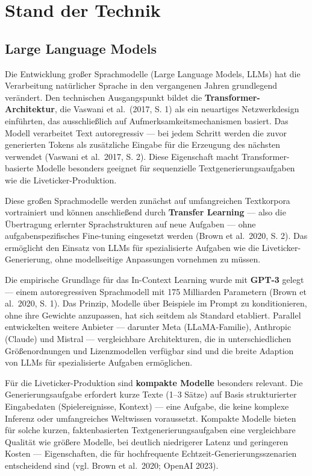 \chapter{Stand der Technik}\label{stand-der-technik}

\section{Large Language Models}\label{large-language-models}

Die Entwicklung großer Sprachmodelle (Large Language Models, LLMs) hat
die Verarbeitung natürlicher Sprache in den vergangenen Jahren
grundlegend verändert. Den technischen Ausgangspunkt bildet die
\textbf{Transformer-Architektur}, die Vaswani et al.~(2017, S. 1) als
ein neuartiges Netzwerkdesign einführten, das ausschließlich auf
Aufmerksamkeitsmechanismen basiert. Das Modell verarbeitet Text
autoregressiv --- bei jedem Schritt werden die zuvor generierten Tokens
als zusätzliche Eingabe für die Erzeugung des nächsten verwendet
(Vaswani et al.~2017, S. 2). Diese Eigenschaft macht
Transformer-basierte Modelle besonders geeignet für sequenzielle
Textgenerierungsaufgaben wie die Liveticker-Produktion.

Diese großen Sprachmodelle werden zunächst auf umfangreichen Textkorpora
vortrainiert und können anschließend durch \textbf{Transfer Learning}
--- also die Übertragung erlernter Sprachstrukturen auf neue Aufgaben
--- ohne aufgabenspezifisches Fine-tuning eingesetzt werden (Brown et
al.~2020, S. 2). Das ermöglicht den Einsatz von LLMs für spezialisierte
Aufgaben wie die Liveticker-Generierung, ohne modellseitige Anpassungen
vornehmen zu müssen.

Die empirische Grundlage für das In-Context Learning wurde mit
\textbf{GPT-3} gelegt --- einem autoregressiven Sprachmodell mit 175
Milliarden Parametern (Brown et al.~2020, S. 1). Das Prinzip, Modelle
über Beispiele im Prompt zu konditionieren, ohne ihre Gewichte
anzupassen, hat sich seitdem als Standard etabliert. Parallel
entwickelten weitere Anbieter --- darunter Meta (LLaMA-Familie),
Anthropic (Claude) und Mistral --- vergleichbare Architekturen, die in
unterschiedlichen Größenordnungen und Lizenzmodellen verfügbar sind und
die breite Adaption von LLMs für spezialisierte Aufgaben ermöglichen.

Für die Liveticker-Produktion sind \textbf{kompakte Modelle} besonders
relevant. Die Generierungsaufgabe erfordert kurze Texte (1--3 Sätze) auf
Basis strukturierter Eingabedaten (Spielereignisse, Kontext) --- eine
Aufgabe, die keine komplexe Inferenz oder umfangreiches Weltwissen
voraussetzt. Kompakte Modelle bieten für solche kurzen, faktenbasierten
Textgenerierungsaufgaben eine vergleichbare Qualität wie größere
Modelle, bei deutlich niedrigerer Latenz und geringeren Kosten ---
Eigenschaften, die für hochfrequente Echtzeit-Generierungsszenarien
entscheidend sind (vgl. Brown et al.~2020; OpenAI 2023).

